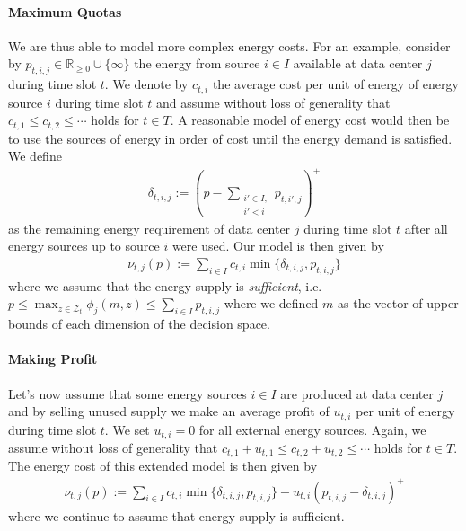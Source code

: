 \paragraph{Maximum Quotas} We are thus able to model more complex energy costs. For an example, consider by $p_{t,i,j} \in \mathbb{R}_{\geq 0} \cup \{\infty\}$ the energy from source $i \in I$ available at data center $j$ during time slot $t$. We denote by $c_{t,i}$ the average cost per unit of energy of energy source $i$ during time slot $t$ and assume without loss of generality that $c_{t,1} \leq c_{t,2} \leq \cdots$ holds for $t \in T$. A reasonable model of energy cost would then be to use the sources of energy in order of cost until the energy demand is satisfied. We define \begin{align*}
    \delta_{t,i,j} := (p - \sum_{\substack{i' \in I, \\ i' < i}} p_{t,i',j})^+
\end{align*} as the remaining energy requirement of data center $j$ during time slot $t$ after all energy sources up to source $i$ were used. Our model is then given by \begin{align*}
    \nu_{t,j}(p) := \sum_{i \in I} c_{t,i} \min\{\delta_{t,i,j}, p_{t,i,j}\}
\end{align*} where we assume that the energy supply is \textit{sufficient}, i.e. $p \leq \max_{z \in \mathcal{Z}_t} \phi_j(m,z) \leq \sum_{i \in I} p_{t,i,j}$ where we defined $m$ as the vector of upper bounds of each dimension of the decision space.

\paragraph{Making Profit} Let's now assume that some energy sources $i \in I$ are produced at data center $j$ and by selling unused supply we make an average profit of $u_{t,i}$ per unit of energy during time slot $t$. We set $u_{t,i} = 0$ for all external energy sources. Again, we assume without loss of generality that $c_{t,1} + u_{t,1} \leq c_{t,2} + u_{t,2} \leq \cdots$ holds for $t \in T$. The energy cost of this extended model is then given by \begin{align*}
    \nu_{t,j}(p) := \sum_{i \in I} c_{t,i} \min\{\delta_{t,i,j}, p_{t,i,j}\} - u_{t,i} (p_{t,i,j} - \delta_{t,i,j})^+
\end{align*} where we continue to assume that energy supply is sufficient.


